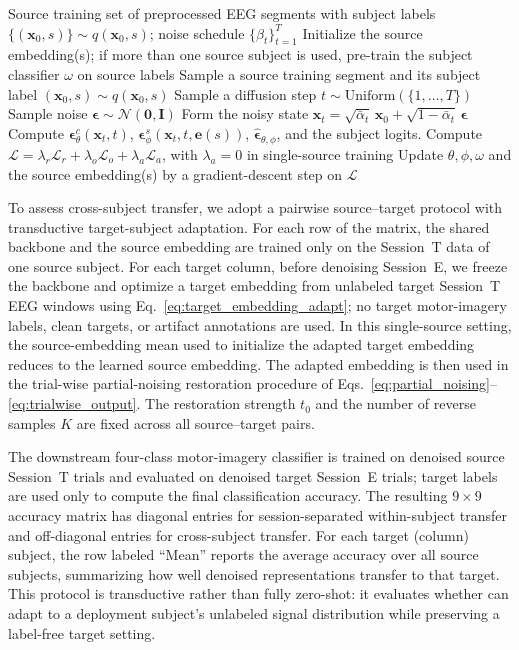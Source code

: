 \begin{algorithm}[t]
\caption{\saddpm{} source training.}
\label{alg:training}
\begin{algorithmic}[1]
\Require Source training set of preprocessed EEG segments with subject labels $\{(\mathbf{x}_0,s)\}\sim q(\mathbf{x}_0,s)$; noise schedule $\{\beta_t\}_{t=1}^{T}$
\State Initialize the source embedding(s); if more than one source subject is used, pre-train the subject classifier $\omega$ on source labels
  \State Sample a source training segment and its subject label $(\mathbf{x}_0,s)\sim q(\mathbf{x}_0,s)$
  \State Sample a diffusion step $t\sim\mathrm{Uniform}(\{1,\dots,T\})$
  \State Sample noise $\boldsymbol{\epsilon}\sim\mathcal{N}(\mathbf{0},\mathbf{I})$
  \State Form the noisy state $\mathbf{x}_t=\sqrt{\bar{\alpha}_t}\,\mathbf{x}_0+\sqrt{1-\bar{\alpha}_t}\,\boldsymbol{\epsilon}$
  \State Compute
  $\boldsymbol{\epsilon}^{c}_{\theta}(\mathbf{x}_t,t)$,
  $\boldsymbol{\epsilon}^{s}_{\phi}(\mathbf{x}_t,t,\mathbf{e}(s))$,
  $\widehat{\boldsymbol{\epsilon}}_{\theta,\phi}$,
  and the subject logits.
  \State Compute $\mathcal{L}=\lambda_r\mathcal{L}_r+\lambda_o\mathcal{L}_o+\lambda_a\mathcal{L}_a$, with $\lambda_a=0$ in single-source training
  \State Update $\theta,\phi,\omega$ and the source embedding(s) by a gradient-descent step on $\mathcal{L}$
\EndWhile
\end{algorithmic}
\end{algorithm}

To assess cross-subject transfer, we adopt a pairwise source--target protocol
with transductive target-subject adaptation. For each row of the matrix, the
shared \saddpm{} backbone and the source embedding are trained only on the
Session~T data of one source subject. For each target column, before denoising
Session~E, we freeze the backbone and optimize a target embedding from unlabeled
target Session~T EEG windows using Eq.~\eqref{eq:target_embedding_adapt};
no target motor-imagery labels, clean targets, or artifact annotations are used.
In this single-source setting, the source-embedding mean used to initialize the
adapted target embedding reduces to the learned source embedding. The adapted
embedding is then used in the trial-wise partial-noising restoration procedure
of Eqs.~\eqref{eq:partial_noising}--\eqref{eq:trialwise_output}. The
restoration strength $t_0$ and the number of reverse samples $K$ are fixed
across all source--target pairs.

The downstream four-class motor-imagery classifier is trained on denoised source
Session~T trials and evaluated on denoised target Session~E trials; target
labels are used only to compute the final classification accuracy. The resulting
$9\times9$ accuracy matrix has diagonal entries for session-separated
within-subject transfer and off-diagonal entries for cross-subject transfer.
For each target (column) subject, the row labeled ``Mean'' reports the average
accuracy over all source subjects, summarizing how well denoised representations
transfer to that target. This protocol is transductive rather than fully
zero-shot: it evaluates whether \saddpm{} can adapt to a deployment
subject's unlabeled signal distribution while preserving a label-free target setting.

